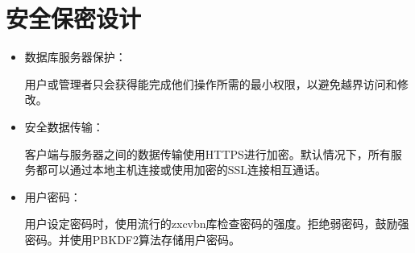 \chapter{安全保密设计}
\begin{itemize}
\item 数据库服务器保护：

用户或管理者只会获得能完成他们操作所需的最小权限，以避免越界访问和修改。
\item 安全数据传输：

客户端与服务器之间的数据传输使用HTTPS进行加密。默认情况下，所有服务都可以通过本地主机连接或使用加密的SSL连接相互通话。

\item 用户密码：

用户设定密码时，使用流行的zxcvbn库检查密码的强度。拒绝弱密码，鼓励强密码。并使用PBKDF2算法存储用户密码。


\end{itemize}
